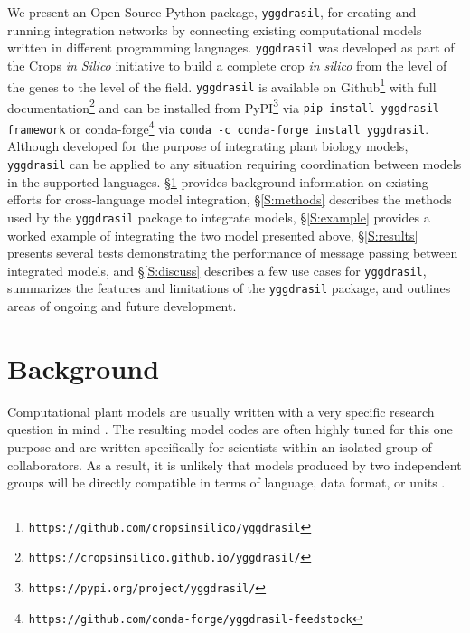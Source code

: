 \documentclass[journal]{IEEEtran}
\newcommand{\pippkg}{{\tt yggdrasil-framework}}
\newcommand{\condapkg}{{\tt yggdrasil}}
\newcommand{\pkg}{{\tt yggdrasil}{}}
\newcommand{\pkglink}{yggdrasil}
\begin{document}
We present an Open Source Python package, {\pkg}, for creating and running integration networks by connecting existing computational models written in different programming languages. {\pkg} was developed as part of the Crops \emph{in Silico} \citep{Marshall-Colon2017} initiative to build a complete crop \emph{in silico} from the level of the genes to the level of the field. {\pkg} is available on Github\footnote{{\tt https://github.com/cropsinsilico/\pkglink}} with full documentation\footnote{{\tt https://cropsinsilico.github.io/\pkglink/}} and can be installed from PyPI\footnote{{\tt https://pypi.org/project/\pkglink/}} via {\tt pip install {\pippkg}} or conda-forge\footnote{{\tt https://github.com/conda-forge/\pkglink-feedstock}} via {\tt conda -c conda-forge install {\condapkg}}. Although developed for the purpose of integrating plant biology models, {\pkg} can be applied to any situation requiring coordination between models in the supported languages. \S\ref{S:background} provides background information on existing efforts for cross-language model integration, \S\ref{S:methods} describes the methods used by the {\pkg} package to integrate models, \S\ref{S:example} provides a worked example of integrating the two model presented above, \S\ref{S:results} presents several tests demonstrating the performance of message passing between integrated models, and \S\ref{S:discuss} describes a few use cases for {\pkg}, 
summarizes the features and limitations of the {\pkg} package, and outlines areas of ongoing and future development.

\section{Background}\label{S:background}
%
Computational plant models are usually written with a very specific research question in mind \citep[e.g. describing a specific metabolic pathway in C4 photosynthesis,][]{Wang2014}. The resulting model codes are often highly tuned for this one purpose and are written specifically for scientists within an isolated group of collaborators. As a result, it is unlikely that models produced by two independent groups will be directly compatible in terms of language, data format, or units \citep{Marshall-Colon2017}. 
\end{document}
